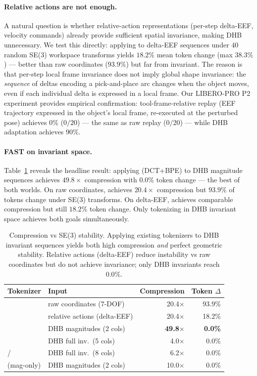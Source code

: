 \paragraph{Relative actions are not enough.}
A natural question is whether relative-action representations (per-step delta-EEF,
velocity commands) already provide sufficient spatial invariance, making DHB unnecessary.
We test this directly: applying \fast{} to delta-EEF sequences under $40$ random SE(3)
workspace transforms yields $18.2\%$ mean token change (max $38.3\%$) --- better than
raw coordinates ($93.9\%$) but far from invariant.
The reason is that per-step local frame invariance does not imply global shape invariance:
the \emph{sequence} of deltas encoding a pick-and-place arc changes when the object moves,
even if each individual delta is expressed in a local frame.
Our LIBERO-PRO P2 experiment provides empirical confirmation: tool-frame-relative replay
(EEF trajectory expressed in the object's local frame, re-executed at the perturbed pose)
achieves $0\%$ ($0/20$) --- the same as raw replay ($0/20$) --- while DHB adaptation achieves $90\%$.

\paragraph{FAST on invariant space.}
Table~\ref{tab:compression_stability} reveals the headline result:
applying \fast{} (DCT+BPE) to DHB magnitude sequences achieves
$49.8\times$ compression with $0.0\%$ token change --- the best of both worlds.
On raw coordinates, \fast{} achieves $20.4\times$ compression but
$93.9\%$ of tokens change under SE(3) transforms.
On delta-EEF, \fast{} achieves comparable compression but still $18.2\%$ token change.
Only tokenizing in DHB invariant space achieves both goals simultaneously.

\begin{table}[ht]
\centering
\small
\caption{Compression vs SE(3) stability. Applying existing tokenizers to DHB
invariant sequences yields both high compression \emph{and} perfect geometric
stability. Relative actions (delta-EEF) reduce instability vs raw coordinates
but do not achieve invariance; only DHB invariants reach $0.0\%$.}
\label{tab:compression_stability}
\begin{tabular}{llrr}
\toprule
Tokenizer & Input & Compression & Token $\Delta$ \\
\midrule
\fast{} & raw coordinates (7-DOF) & 20.4$\times$ & 93.9\% \\
\fast{} & relative actions (delta-EEF) & 20.4$\times$ & 18.2\% \\
\fast{} & DHB magnitudes (2 cols) & \textbf{49.8$\times$} & \textbf{0.0\%} \\
\fast{} & DHB full inv.\ (5 cols) & 4.0$\times$ & 0.0\% \\
\oat{}/\dhb{} & DHB full inv.\ (8 cols) & 6.2$\times$ & 0.0\% \\
\oat{} (mag-only) & DHB magnitudes (2 cols) & 10.0$\times$ & 0.0\% \\
\bottomrule
\end{tabular}
\end{table}

